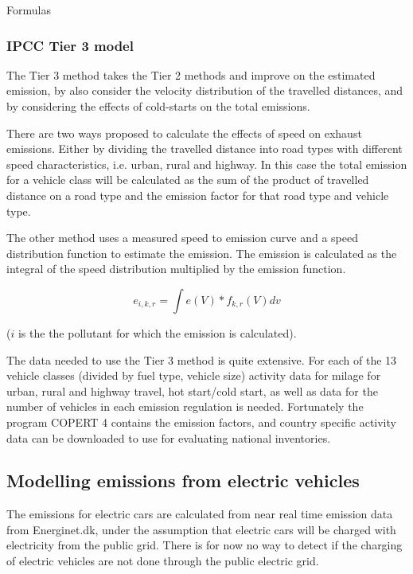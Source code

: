 Formulas



\subsubsection{IPCC Tier 3 model} 
The Tier 3 method takes the Tier 2 methods and improve on the estimated emission, by also consider the velocity distribution of the travelled distances, and by considering the effects of cold-starts on the total emissions.

There are two ways proposed to calculate the effects of speed on exhaust emissions. Either by dividing the travelled distance into road types with different speed characteristics, i.e. urban, rural and highway. In this case the total emission for a vehicle class will be calculated as the sum of the product of travelled distance on a road type and the emission factor for that road type and vehicle type.

The other method uses a measured speed to emission curve and a speed distribution function to estimate the emission. The emission is calculated as the integral of the speed distribution multiplied by the emission function.

\begin{equation}
e_{i,k,r} = \int{e(V)*f_{k,r}(V)dv}
\end{equation}

($i$ is the the pollutant for which the emission is calculated).

The data needed to use the Tier 3 method is quite extensive. For each of the 13 vehicle classes (divided by fuel type, vehicle size) activity data for milage for urban, rural and highway travel, hot start/cold start, as well as data for the number of vehicles in each emission regulation is needed. Fortunately the program COPERT 4 contains the emission factors, and country specific activity data can be downloaded to use for evaluating national inventories.


\subsection{Modelling emissions from electric vehicles}
The emissions for electric cars are calculated from near real time emission data from Energinet.dk, under the assumption that electric cars will be charged with electricity from the public grid. There is for now no way to detect if the charging of electric vehicles are not done through the public electric grid.
